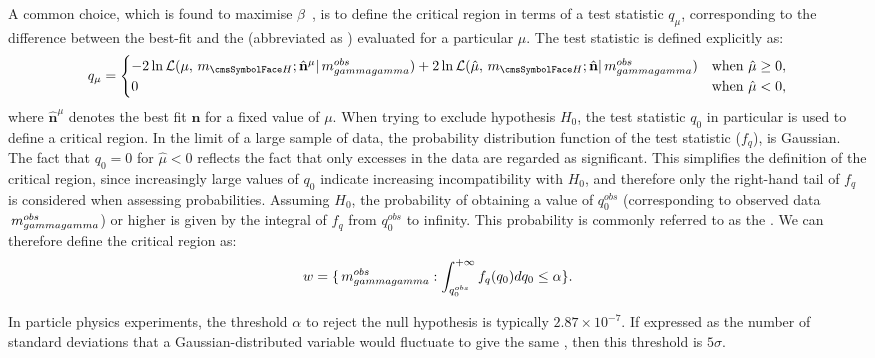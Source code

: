 A common choice, which is found to maximise $\beta$~\cite{Cowan}, is to define the critical region in terms of a test statistic $q_{\mu}$, corresponding to the difference between the best-fit \NLL and the \NLL (abbreviated as \DNLL) evaluated for a particular $\mu$. The test statistic is defined explicitly as:
\begin{equation}
\label{eq:statandresults:test_statistic}
q_{\mu} = \begin{cases} 
 -2 \ln \mathcal{L}(\mu,\mH; \hat{\mathbf{n}}^{\mu}| \mgg^{obs}) + 2\ln\mathcal{L}(\hat{\mu},\mH;\hat{\mathbf{n}}| \mgg^{obs} ) & \text{when } \hat{\mu} \geq 0, \\
 0 & \text{when } \hat{\mu} < 0, 
 \end{cases}
\end{equation}
where $\hat{\mathbf{n}}^{\mu}$ denotes the best fit $\mathbf{n}$ for a fixed value of $\mu$. 
When trying to exclude hypothesis $H_{0}$, the test statistic $q_{0}$ in particular is used to define a critical region. In the limit of a large sample of data, the probability distribution function of the test statistic ($f_q$), is Gaussian. The fact that $q_{0} =0$ for $\hat{\mu} < 0$ reflects the fact that only excesses in the data are regarded as significant. This simplifies the definition of the critical region, since increasingly large values of $q_{0}$ indicate increasing incompatibility with $H_{0}$, and therefore only the right-hand tail of $f_q$ is considered when assessing probabilities. Assuming $H_{0}$, the probability of obtaining a value of $q^{{obs}}_{0}$ (corresponding to observed data $ \,m_{gammagamma}^{obs}$) or higher is given by the integral of $f_q$ from $q^{{obs}}_{0}$ to infinity. This probability is commonly referred to as the \pvalue. We can therefore define the critical region as: 
\begin{equation}
w = \{ \,m_{gammagamma}^{obs} : \int_{q^{{obs}}_{0}}^{+\infty} f_q(q_{0}) dq_0 \leq \alpha \}.
\end{equation}

In particle physics experiments, the threshold $\alpha$ to reject the null hypothesis is typically $2.87 \times 10^{-7}$. If expressed as the number of standard deviations that a Gaussian-distributed variable would fluctuate to give the same \pvalue, then this threshold is $5\sigma$.

